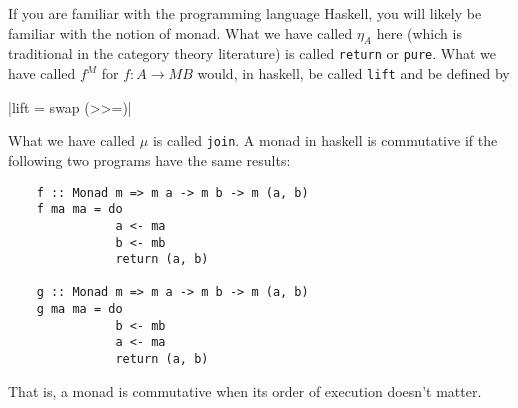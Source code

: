 \documentclass[DynamicalBook]{subfiles}
\begin{document}
\begin{remark}
  If you are familiar with the programming language Haskell, you will likely be
  familiar with the notion of monad. What we have called $\eta_A$ here (which is
  traditional in the category theory literature) is called
  \texttt{return} or \texttt{pure}. What we have
  called $f^M$ for $f : A \to MB$ would, in haskell, be called
  \texttt{lift} and be defined by

  |lift = swap (>>=)|

  What we have called $\mu$ is called \texttt{join}. A monad in haskell is commutative if the following two programs have the same
  results:
  \begin{verbatim}
    f :: Monad m => m a -> m b -> m (a, b)
    f ma ma = do
               a <- ma
               b <- mb
               return (a, b)

    g :: Monad m => m a -> m b -> m (a, b)
    g ma ma = do
               b <- mb
               a <- ma
               return (a, b)
  \end{verbatim}
  That is, a monad is commutative when its order of execution doesn't matter.
\end{remark}
\end{document}
